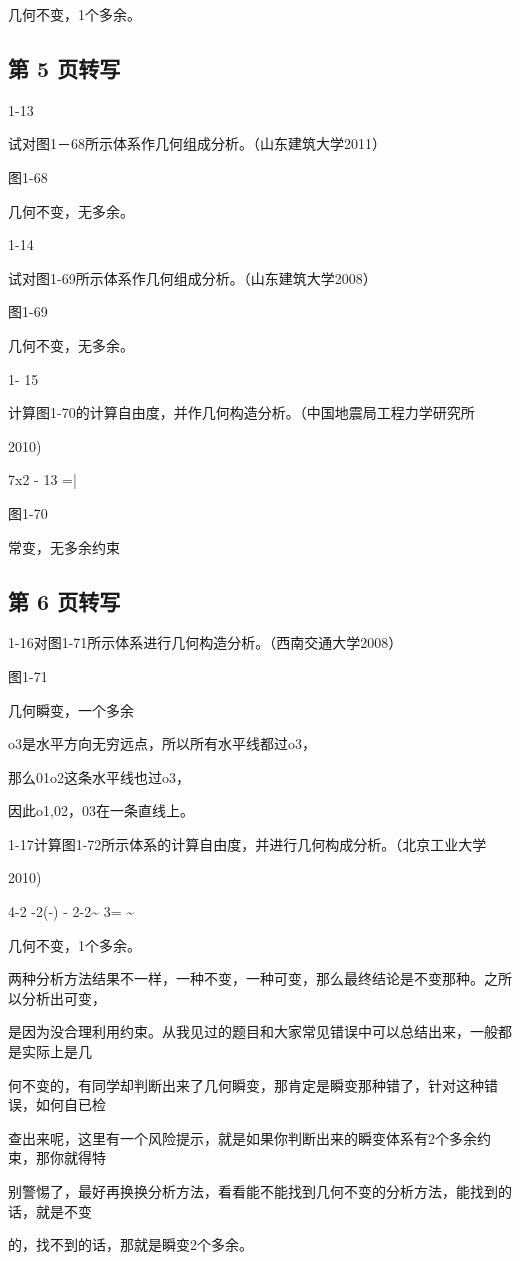 几何不变，1个多余。

\subsection*{第 5 页转写}
1-13

试对图1－68所示体系作几何组成分析。（山东建筑大学2011）

图1-68

几何不变，无多余。

1-14

试对图1-69所示体系作几何组成分析。（山东建筑大学2008）

图1-69

几何不变，无多余。

1- 15

计算图1-70的计算自由度，并作几何构造分析。（中国地震局工程力学研究所

2010)

7x2 - 13 =|

图1-70

常变，无多余约束

\subsection*{第 6 页转写}
1-16对图1-71所示体系进行几何构造分析。（西南交通大学2008）

图1-71

几何瞬变，一个多余

o3是水平方向无穷远点，所以所有水平线都过o3，

那么01o2这条水平线也过o3，

因此o1,02，03在一条直线上。

1-17计算图1-72所示体系的计算自由度，并进行几何构成分析。（北京工业大学

2010)

4-2 -2(-) - 2-2\textasciitilde{} 3= \textasciitilde{}

几何不变，1个多余。

两种分析方法结果不一样，一种不变，一种可变，那么最终结论是不变那种。之所以分析出可变，

是因为没合理利用约束。从我见过的题目和大家常见错误中可以总结出来，一般都是实际上是几

何不变的，有同学却判断出来了几何瞬变，那肯定是瞬变那种错了，针对这种错误，如何自已检

查出来呢，这里有一个风险提示，就是如果你判断出来的瞬变体系有2个多余约束，那你就得特

别警惕了，最好再换换分析方法，看看能不能找到几何不变的分析方法，能找到的话，就是不变

的，找不到的话，那就是瞬变2个多余。

